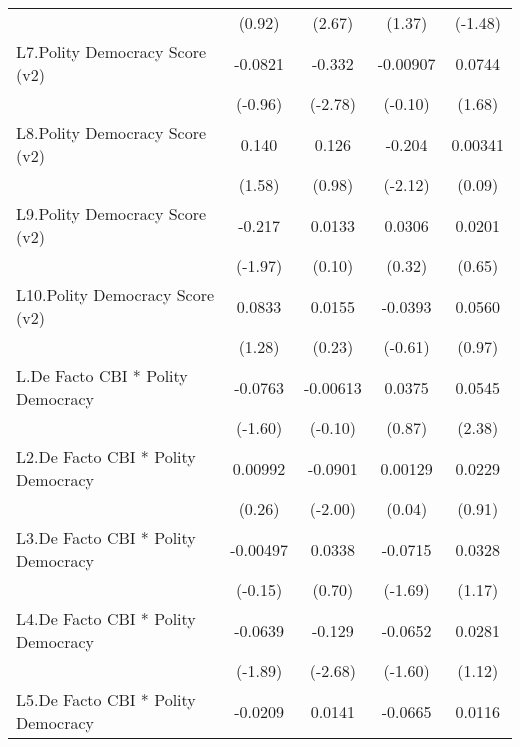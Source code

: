 {\begin{longtable}{l*{4}{c}}
                &   (0.92)         &   (2.67)         &   (1.37)         &  (-1.48)         \\
\addlinespace
L7.Polity Democracy Score (v2)&  -0.0821         &   -0.332\sym{**} & -0.00907         &   0.0744         \\
                &  (-0.96)         &  (-2.78)         &  (-0.10)         &   (1.68)         \\
\addlinespace
L8.Polity Democracy Score (v2)&    0.140         &    0.126         &   -0.204\sym{*}  &  0.00341         \\
                &   (1.58)         &   (0.98)         &  (-2.12)         &   (0.09)         \\
\addlinespace
L9.Polity Democracy Score (v2)&   -0.217\sym{*}  &   0.0133         &   0.0306         &   0.0201         \\
                &  (-1.97)         &   (0.10)         &   (0.32)         &   (0.65)         \\
\addlinespace
L10.Polity Democracy Score (v2)&   0.0833         &   0.0155         &  -0.0393         &   0.0560         \\
                &   (1.28)         &   (0.23)         &  (-0.61)         &   (0.97)         \\
\addlinespace
L.De Facto CBI * Polity Democracy&  -0.0763         & -0.00613         &   0.0375         &   0.0545\sym{*}  \\
                &  (-1.60)         &  (-0.10)         &   (0.87)         &   (2.38)         \\
\addlinespace
L2.De Facto CBI * Polity Democracy&  0.00992         &  -0.0901\sym{*}  &  0.00129         &   0.0229         \\
                &   (0.26)         &  (-2.00)         &   (0.04)         &   (0.91)         \\
\addlinespace
L3.De Facto CBI * Polity Democracy& -0.00497         &   0.0338         &  -0.0715         &   0.0328         \\
                &  (-0.15)         &   (0.70)         &  (-1.69)         &   (1.17)         \\
\addlinespace
L4.De Facto CBI * Polity Democracy&  -0.0639         &   -0.129\sym{**} &  -0.0652         &   0.0281         \\
                &  (-1.89)         &  (-2.68)         &  (-1.60)         &   (1.12)         \\
\addlinespace
L5.De Facto CBI * Polity Democracy&  -0.0209         &   0.0141         &  -0.0665         &   0.0116         \\

\end{longtable}}
